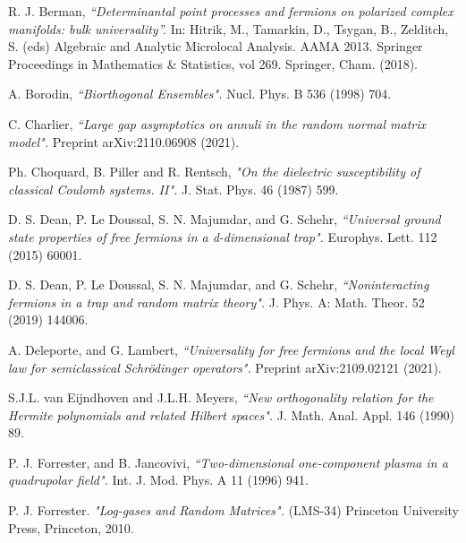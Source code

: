 \documentclass[%
 jmp,
cp,  %
 amsmath,amsthm,amssymb,%
 reprint,%
onecolumn]{revtex4-2}
\begin{document}
\begin{thebibliography}{1}
      R. J. Berman,
     \emph{``Determinantal point processes and fermions on polarized complex manifolds: bulk universality''.} 
      In: Hitrik, M., Tamarkin, D., Tsygan, B., Zelditch, S. (eds) Algebraic and Analytic Microlocal Analysis. AAMA 2013. Springer Proceedings in Mathematics \& Statistics, vol 269. Springer, Cham. (2018). 
     

      A. Borodin, 
     \emph{``Biorthogonal Ensembles".} 
     Nucl. Phys. B 536 (1998)%
     704.%
     
     
 C. Charlier,  \emph{``Large gap asymptotics on annuli in the random normal matrix model".} Preprint arXiv:2110.06908 (2021).

Ph. Choquard, B. Piller and R. Rentsch,
\emph{"On the dielectric susceptibility of classical Coulomb systems. II".}
 J. Stat. Phys. 46 (1987) 599. 


 D. S. Dean, P. Le Doussal, S. N. Majumdar, and G. Schehr, 
\emph{``Universal ground state properties of free fermions in a d-dimensional trap".} 
Europhys. Lett. 112 (2015) 60001. %


 D. S. Dean, P. Le Doussal, S. N. Majumdar, and G. Schehr, 
\emph{``Noninteracting fermions in a trap and random matrix theory".} 
J. Phys. A: Math. Theor. 52 (2019) 144006.

 A. Deleporte, and G. Lambert, 
\emph{``Universality for free fermions and the local Weyl law for semiclassical Schrödinger operators".} Preprint 
arXiv:2109.02121 (2021).

S.J.L. van Eijndhoven and J.L.H. Meyers, \emph{``New orthogonality relation for the Hermite polynomials and related Hilbert spaces".}  J. Math. Anal. Appl. 146 (1990) 89.



 P. J. Forrester, and B. Jancovivi,
\emph{``Two-dimensional one-component plasma in a quadrupolar field".}   
Int. J. Mod. Phys. A 11 (1996) 941.%

P.  J. Forrester. \emph{"Log-gases and Random Matrices".} (LMS-34) Princeton University Press, Princeton, 2010.



\end{thebibliography}
\end{document}
